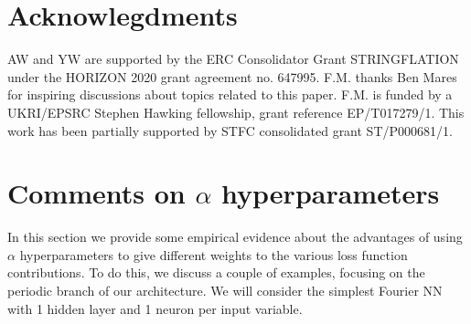 \documentclass{article}
\begin{document}

\section*{Acknowlegdments}

AW and YW are supported by the ERC Consolidator Grant STRINGFLATION under the HORIZON 2020 grant agreement no. 647995. F.M. thanks Ben Mares for inspiring discussions about topics related to this paper. F.M. is funded by a UKRI/EPSRC Stephen Hawking fellowship, grant reference EP/T017279/1. This work has been partially supported by STFC consolidated grant ST/P000681/1.





%


\appendix
\section{Comments on $\alpha$ hyperparameters}
\label{sec:AppendixA}
In this section we provide some empirical evidence about the advantages of using $\alpha$ hyperparameters to give different weights to the various loss function contributions. To do this, we discuss a couple of examples, focusing on the periodic branch of our architecture. We will consider the simplest Fourier NN with 1 hidden layer and 1 neuron per input variable. 
\end{document}
